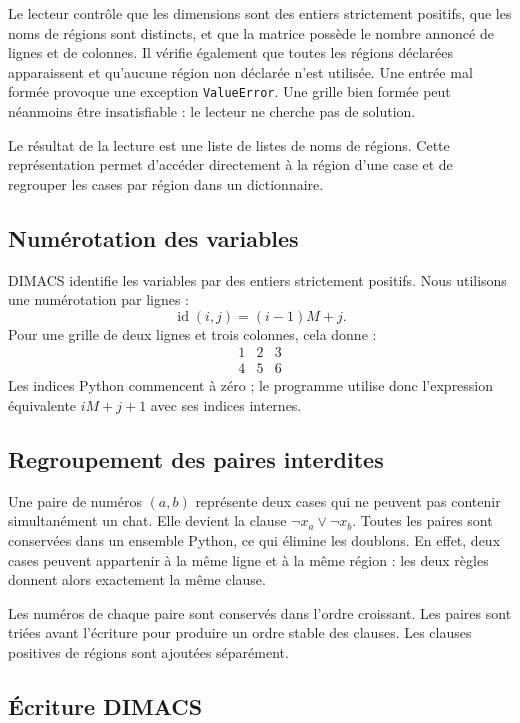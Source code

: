 \documentclass[11pt,a4paper]{article}
\begin{document}
Le lecteur contrôle que les dimensions sont des entiers strictement
positifs, que les noms de régions sont distincts, et que la matrice possède
le nombre annoncé de lignes et de colonnes. Il vérifie également que toutes
les régions déclarées apparaissent et qu'aucune région non déclarée n'est
utilisée. Une entrée mal formée provoque une exception \texttt{ValueError}.
Une grille bien formée peut néanmoins être insatisfiable : le lecteur
ne cherche pas de solution.

Le résultat de la lecture est une liste de listes de noms de régions.
Cette représentation permet d'accéder directement à la région d'une case
et de regrouper les cases par région dans un dictionnaire.

\subsection{Numérotation des variables}

DIMACS identifie les variables par des entiers strictement positifs.
Nous utilisons une numérotation par lignes :
\[
  \operatorname{id}(i,j)=(i-1)M+j.
\]
Pour une grille de deux lignes et trois colonnes, cela donne :
\[
\begin{matrix}
1&2&3\\
4&5&6
\end{matrix}
\]
Les indices Python commencent à zéro ; le programme utilise donc
l'expression équivalente $iM+j+1$ avec ses indices internes.

\subsection{Regroupement des paires interdites}

Une paire de numéros $(a,b)$ représente deux cases qui ne peuvent pas
contenir simultanément un chat. Elle devient la clause
$\neg x_a\lor\neg x_b$. Toutes les paires sont conservées dans un ensemble
Python, ce qui élimine les doublons. En effet, deux cases peuvent appartenir
à la même ligne et à la même région : les deux règles donnent alors
exactement la même clause.

Les numéros de chaque paire sont conservés dans l'ordre croissant.
Les paires sont triées avant l'écriture pour produire un ordre stable
des clauses. Les clauses positives de régions sont ajoutées séparément.

\subsection{Écriture DIMACS}
\end{document}
